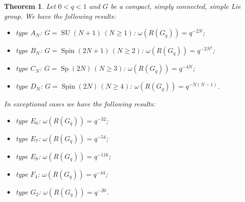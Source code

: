 \documentclass[11 pt, leqno]{amsart}
\newcommand{\oon}{\operatorname}
\DeclareMathOperator{\SU}{SU}
\newtheorem{theorem}{Theorem}[section]
\theoremstyle{definition}
\numberwithin{equation}{section}
\begin{document}
\begin{theorem}\label{thm1}
Let $0<q<1$ and $G$ be a compact, simply connected, simple Lie group. We have the following results:
\begin{itemize}
\item type $A_N$: $G=\SU(N+1)\,(N\ge 1)$: $\omega(R(G_q))=q^{-2N}$;
\item type $B_N$: $G=\oon{Spin}(2N+1)\,(N\ge 2)$: $\omega(R(G_q))=q^{-2N^2}$;
\item type $C_N$: $G=\oon{Sp}(2N)\,(N\ge 3)$: $\omega(R(G_q))=q^{-4N}$;
\item type $D_N$: $G=\oon{Spin}(2N)\,(N\ge 4)$: $\omega(R(G_q))=q^{-N(N-1)}$.
\end{itemize}
In exceptional cases we have the following results:
\begin{itemize}
\item type $E_6$: $\omega(R(G_q))=q^{-32}$;
\item type $E_7$: $\omega(R(G_q))=q^{-54}$;
\item type $E_8$: $\omega(R(G_q))=q^{-116}$;
\item type $F_4$: $\omega(R(G_q))=q^{-44}$;
\item type $G_2$: $\omega(R(G_q))=q^{-20}$.
\end{itemize}
\end{theorem}
\end{document}
